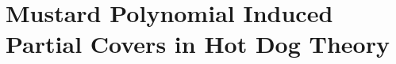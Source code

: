 \chapter{Mustard Polynomial Induced Partial Covers in Hot Dog Theory}
\label{paper2}





\pagebreak
\singlespacing
{}
\doublespacing
